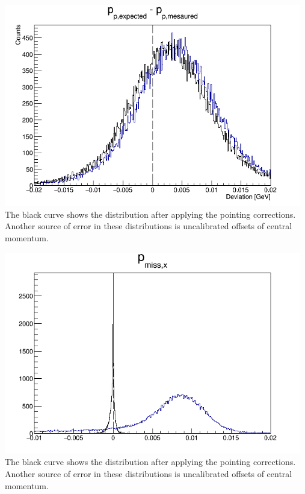 \documentclass{article}
\begin{document}
\begin{center}
\includegraphics[width=13cm]{../report-H/delPp.png}\\
The black curve shows the distribution after applying the pointing corrections. Another source of error in these distributions is uncalibrated offsets of central momentum.
\end{center}

\begin{center}
\includegraphics[width=13cm]{../report-H/delPmx.png}\\
The black curve shows the distribution after applying the pointing corrections. Another source of error in these distributions is uncalibrated offsets of central momentum.
\end{center}
\end{document}
